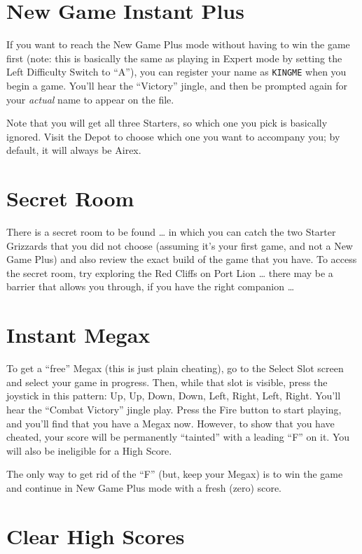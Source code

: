 \documentclass[10pt,twocolumn]{memoir}
\begin{document}
\section{New Game Instant Plus}

If you want  to reach the New  Game Plus mode without having  to win the
game first (note:  this is basically the same as  playing in Expert mode
by setting the  Left Difficulty Switch to ``A''), you  can register your
name  as  \texttt{KINGME}  when  you  begin  a  game.  You'll  hear  the
``Victory'' jingle,  and then be  prompted again for  your \emph{actual}
name to appear on the file.

Note that  you will  get all three  Starters, so which  one you  pick is
basically  ignored. Visit  the Depot  to choose  which one  you want  to
accompany you; by default, it will always be Airex.

\section{Secret Room}

There is  a secret room  to be found  … in which  you can catch  the two
Starter  Grizzards that  you did  not choose  (assuming it's  your first
game, and not  a New Game Plus)  and also review the exact  build of the
game that  you have. To  access the secret  room, try exploring  the Red
Cliffs on Port Lion … there may be a barrier that allows you through, if
you have the right companion …

\section{Instant Megax}

To get a ``free'' Megax (this is  just plain cheating), go to the Select
Slot screen and  select your game in progress. Then,  while that slot is
visible, press the  joystick in this pattern: Up, Up,  Down, Down, Left,
Right,  Left, Right.  You'll hear  the ``Combat  Victory'' jingle  play.
Press the  Fire button to start  playing, and you'll find  that you have
a Megax now. However, to show that  you have cheated, your score will be
permanently ``tainted''  with a leading  ``F'' on  it. You will  also be
ineligible for a High Score.

The only way  to get rid of the  ``F'' (but, keep your Megax)  is to win
the game and continue in New Game Plus mode with a fresh (zero) score.

\section{Clear High Scores}
\end{document}
